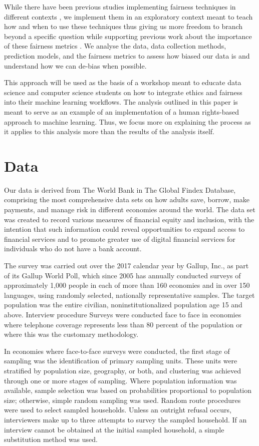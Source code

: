 \documentclass[water,article,submit,moreauthors,pdftex]{mdpi}
\begin{document}
While there have been previous studies implementing fairness techniques
in different contexts \citep{deho2022existing, kim2022information}, we
implement them in an exploratory context meant to teach how and when to
use these techniques thus giving us more freedom to branch beyond a
specific question while supporting previous work about the importance of
these fairness metrics
\citep{anahideh2022fair, barocas_fairness_nodate}. We analyse the data,
data collection methods, prediction models, and the fairness metrics to
assess how biased our data is and understand how we can de-bias when
possible.

This approach will be used as the basis of a workshop meant to educate
data science and computer science students on how to integrate ethics
and fairness into their machine learning workflows. The analysis
outlined in this paper is meant to serve as an example of an
implementation of a human rights-based approach to machine learning.
Thus, we focus more on explaining the process as it applies to this
analysis more than the results of the analysis itself.

\hypertarget{data}{%
\section{Data}\label{data}}

Our data is derived from The World Bank in The Global Findex Database,
comprising the most comprehensive data sets on how adults save, borrow,
make payments, and manage risk in different economies around the world.
The data set was created to record various measures of financial equity
and inclusion, with the intention that such information could reveal
opportunities to expand access to financial services and to promote
greater use of digital financial services for individuals who do not
have a bank account.

The survey was carried out over the 2017 calendar year by Gallup, Inc.,
as part of its Gallup World Poll, which since 2005 has annually
conducted surveys of approximately 1,000 people in each of more than 160
economies and in over 150 languages, using randomly selected, nationally
representative samples. The target population was the entire civilian,
noninstitutionalized population age 15 and above. Interview procedure
Surveys were conducted face to face in economies where telephone
coverage represents less than 80 percent of the population or where this
was the customary methodology.

In economies where face-to-face surveys were conducted, the first stage
of sampling was the identification of primary sampling units. These
units were stratified by population size, geography, or both, and
clustering was achieved through one or more stages of sampling. Where
population information was available, sample selection was based on
probabilities proportional to population size; otherwise, simple random
sampling was used. Random route procedures were used to select sampled
households. Unless an outright refusal occurs, interviewers make up to
three attempts to survey the sampled household. If an interview cannot
be obtained at the initial sampled household, a simple substitution
method was used.
\end{document}
